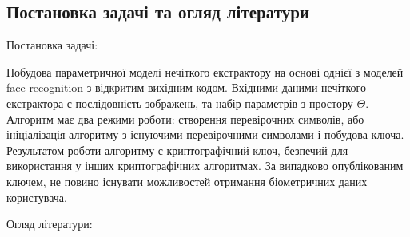 \documentclass[11pt]{article}
\begin{document}
    \hypertarget{ux43fux43eux441ux442ux430ux43dux43eux432ux43aux430-ux437ux430ux434ux430ux447ux456-ux442ux430-ux43eux433ux43bux44fux434-ux43bux456ux442ux435ux440ux430ux442ux443ux440ux438}{%
\subsection{Постановка задачі та огляд
літератури}\label{ux43fux43eux441ux442ux430ux43dux43eux432ux43aux430-ux437ux430ux434ux430ux447ux456-ux442ux430-ux43eux433ux43bux44fux434-ux43bux456ux442ux435ux440ux430ux442ux443ux440ux438}}

Постановка задачі:

Побудова параметричної моделі нечіткого екстрактору на основі однієї з
моделей face-recognition з відкритим вихідним кодом. Вхідними даними
нечіткого екстрактора є послідовність зображень, та набір параметрів з
простору \(\Theta\). Алгоритм має два режими роботи: створення
перевірочних символів, або ініціалізація алгоритму з існуючими
перевірочними символами і побудова ключа. Результатом роботи алгоритму є
криптографічний ключ, безпечий для використання у інших криптографічних
алгоритмах. За випадково опублікованим ключем, не повино існувати
можливостей отримання біометричних даних користувача.

Огляд літератури:
\end{document}
